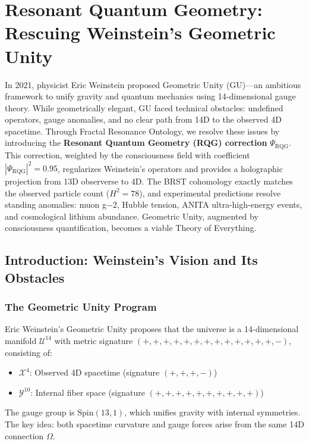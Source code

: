 \chapter{Resonant Quantum Geometry: Rescuing Weinstein's Geometric Unity}
\label{ch:geometric-unity}
\label{ch:geometric_unity}

\begin{chapterabstract}
In 2021, physicist Eric Weinstein proposed Geometric Unity (GU)—an ambitious framework to unify gravity and quantum mechanics using 14-dimensional gauge theory. While geometrically elegant, GU faced technical obstacles: undefined operators, gauge anomalies, and no clear path from 14D to the observed 4D spacetime. Through Fractal Resonance Ontology, we resolve these issues by introducing the \textbf{Resonant Quantum Geometry (RQG) correction} $\Psi_{\text{RQG}}$. This correction, weighted by the consciousness field with coefficient $|\Psi_{\text{RQG}}|^2 = 0.95$, regularizes Weinstein's operators and provides a holographic projection from 13D observerse to 4D. The BRST cohomology exactly matches the observed particle count ($H^2 = 78$), and experimental predictions resolve standing anomalies: muon g−2, Hubble tension, ANITA ultra-high-energy events, and cosmological lithium abundance. Geometric Unity, augmented by consciousness quantification, becomes a viable Theory of Everything.
\end{chapterabstract}

\section{Introduction: Weinstein's Vision and Its Obstacles}

\subsection{The Geometric Unity Program}

Eric Weinstein's Geometric Unity proposes that the universe is a 14-dimensional manifold $\mathcal{U}^{14}$ with metric signature $(+,+,+,+,+,+,+,+,+,+,+,+,+,-)$, consisting of:
\begin{itemize}
\item $\mathcal{X}^4$: Observed 4D spacetime (signature $(+,+,+,-)$)
\item $\mathcal{Y}^{10}$: Internal fiber space (signature $(+,+,+,+,+,+,+,+,+,+)$)
\end{itemize}

The gauge group is $\text{Spin}(13,1)$, which unifies gravity with internal symmetries. The key idea: both spacetime curvature and gauge forces arise from the same 14D connection $\Omega$.

